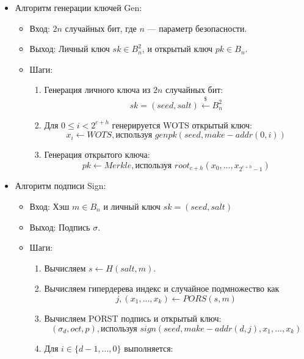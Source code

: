 \documentclass[a4paper, 14pt]{extarticle}
\begin{document}
\begin{itemize}
    \item Алгоритм генерации ключей Gen:

    \begin{itemize}
        \item Вход: $2n$ случайных бит, где $n$ --- параметр безопасности.
        \item Выход: Личный ключ $sk \in B^{2}_{n}$, и открытый ключ $pk \in B_{n}$.
        \item Шаги:

        \begin{enumerate}
            \item Генерация личного ключа из $2n$ случайных бит:
            \[sk = (seed, salt) \stackrel{\$}{\leftarrow} B^{2}_{n}\]
    
            \item Для $0 \leq i < 2^{c+h}$ генерируется WOTS открытый ключ:
            \[x_{i} \leftarrow WOTS, \text{используя } genpk(seed, make-addr(0, i))\]
    
            \item Генерация открытого ключа:
            \[pk \leftarrow Merkle, \text{используя } root_{c+h}(x_{0}, ..., x_{2^{c+h} - 1})\]
        \end{enumerate}
    \end{itemize}

    \item Алгоритм подписи Sign:

    \begin{itemize}
        \item Вход: Хэш $m \in B_{n}$ и личный ключ $sk = (seed, salt)$
        \item Выход: Подпись $\sigma$.
        \item Шаги:

        \begin{enumerate}
            \item Вычисляем $s \leftarrow H(salt, m)$.
    
            \item Вычисляем гипердерева индекс и случайное подмножество как
            \[j, (x_{1}, ..., x_{k}) \leftarrow PORS(s, m)\]
    
            \item Вычисляем PORST подпись и открытый ключ:
            \[(\sigma_{d}, oct, p), \text{используя } sign(seed, make-addr(d, j), x_{1}, ..., x_{k})\]
    
            \item Для $i \in \{d - 1, ..., 0\}$ выполняется:
            

\end{enumerate}
\end{itemize}
\end{itemize}
\end{document}
